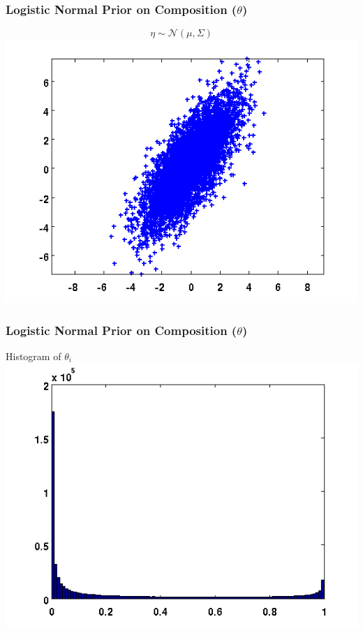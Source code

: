 \begin{frame}
  \frametitle{Logistic Normal Prior on Composition ($\theta$)}
  \begin{center}
    \vspace{-0.4in}
    \begin{equation*}
      \eta \sim \mathcal{N}(\mu, \Sigma)
    \end{equation*}
    \includegraphics[scale=0.6]{img/log-normal-figs/normal-1.png}
  \end{center}
\end{frame}

\begin{frame}
  \frametitle{Logistic Normal Prior on Composition ($\theta$)}
  \begin{center}
    Histogram of $\theta_i$
    \includegraphics[scale=0.6]{img/log-normal-figs/hist-2.png}
  \end{center}
\end{frame}

